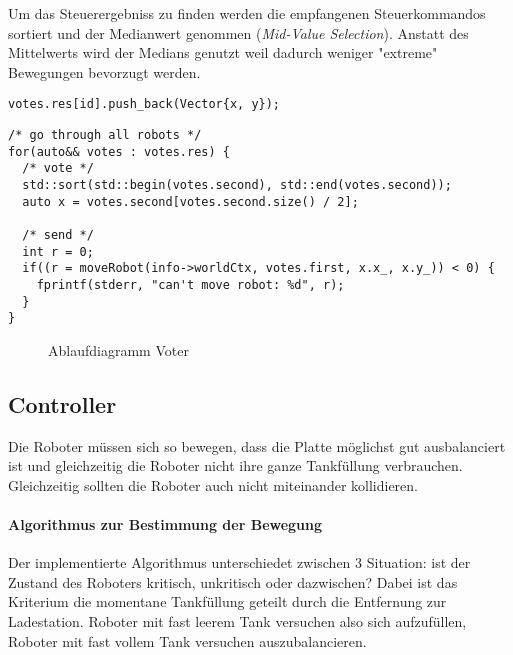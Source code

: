 {Um das Steuerergebniss zu finden werden die empfangenen Steuerkommandos sortiert und der Medianwert genommen 
(\textit{Mid-Value Selection}). Anstatt des Mittelwerts wird der Medians genutzt weil dadurch weniger "extreme"
Bewegungen bevorzugt werden.
\noindent\begin{minipage}{.30\textwidth}
	\begin{lstlisting}[caption=Sammeln, frame=tlrb, language={[11]C++}]
votes.res[id].push_back(Vector{x, y});
\end{lstlisting}
\end{minipage}\hfill
\begin{minipage}{.60\textwidth}
\begin{lstlisting}[caption=Auswahl, frame=tlrb, language={[11]C++}]
/* go through all robots */
for(auto&& votes : votes.res) {
  /* vote */
  std::sort(std::begin(votes.second), std::end(votes.second));
  auto x = votes.second[votes.second.size() / 2];

  /* send */
  int r = 0;
  if((r = moveRobot(info->worldCtx, votes.first, x.x_, x.y_)) < 0) {
  	fprintf(stderr, "can't move robot: %d", r);
  }
}
\end{lstlisting}
\end{minipage}


\begin{figure}
	\centering
	\caption{Ablaufdiagramm Voter}
	\label{fig:sequence-voter}
\end{figure}

\subsection{Controller}\label{controller}
Die Roboter m{\"{u}}ssen sich so bewegen, dass die Platte m{\"{o}}glichst gut ausbalanciert
ist und gleichzeitig die Roboter nicht ihre ganze Tankf{\"{u}}llung verbrauchen. Gleichzeitig sollten
die Roboter auch nicht miteinander kollidieren.

\paragraph{Algorithmus zur Bestimmung der Bewegung} Der implementierte Algorithmus unterschiedet zwischen 3 Situation: ist der Zustand des Roboters kritisch,
unkritisch oder dazwischen? Dabei ist das Kriterium die momentane Tankf{\"{u}}llung geteilt durch die Entfernung zur Ladestation. Roboter mit fast leerem Tank
versuchen also sich aufzuf{\"{u}}llen, Roboter mit fast vollem Tank versuchen auszubalancieren.

}
